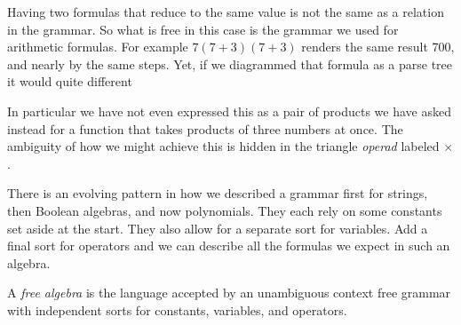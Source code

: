 \begin{remark}
    Having two formulas that reduce to the same value is not the same 
as a relation in the grammar.  So what is free in this case 
is the grammar we used for arithmetic formulas.  
For example $7(7+3)(7+3)$ renders the same result 700, and nearly 
by the same steps.  Yet, if we diagrammed that formula as a
parse tree it would quite different
\begin{center}
\end{center}    
In particular we have not even expressed this as a pair of products 
we have asked instead for a function that takes products of three 
numbers at once.  The ambiguity of how we might achieve this is hidden in the 
triangle \emph{operad} labeled $\times$.
\end{remark}


There is an evolving pattern in how we described a grammar first for strings, 
then Boolean algebras, and now polynomials.  They each rely on some 
constants set aside at the start.  They also allow for a separate sort for
variables.  Add a final sort for operators and we can describe all the formulas 
we expect in such an algebra.
    
\begin{definition}
    A \emph{free algebra} is the language accepted by an unambiguous context free 
    grammar with independent sorts for constants, variables, and operators.
\end{definition}